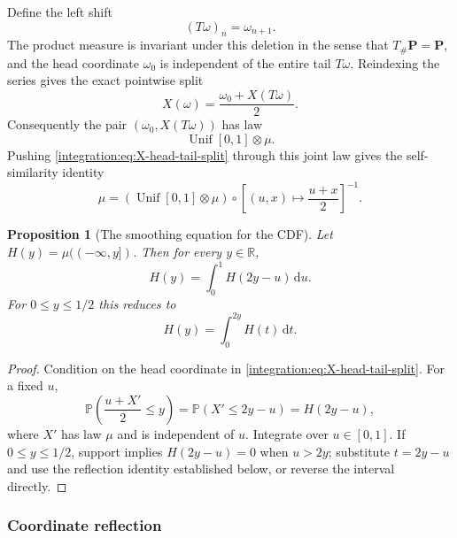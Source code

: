 \documentclass[11pt,oneside]{article}
\newtheorem{proposition}[theorem]{Proposition}
\theoremstyle{definition}
\theoremstyle{remark}
\newcommand{\R}{\mathbb R}
\newcommand{\dd}{\,\mathrm d}
\newcommand{\Prob}{\mathbb P}
\begin{document}
Define the left shift
\begin{equation}
 (T\omega)_n=\omega_{n+1}.
 \label{integration:eq:tail-map}
\end{equation}
The product measure is invariant under this deletion in the sense that $T_\#\mathbf P=\mathbf
P$, and the head coordinate $\omega_0$ is independent of the entire tail $T\omega$.  Reindexing
the series gives the exact pointwise split
\begin{equation}
 X(\omega)=\frac{\omega_0+X(T\omega)}2.
 \label{integration:eq:X-head-tail-split}
\end{equation}
Consequently the pair $(\omega_0,X(T\omega))$ has law
\begin{equation}
 \operatorname{Unif}[0,1]\otimes\mu.
 \label{integration:eq:head-tail-law}
\end{equation}
Pushing \eqref{integration:eq:X-head-tail-split} through this joint law gives the self-similarity identity
\begin{equation}
 \mu=\left(\operatorname{Unif}[0,1]\otimes\mu\right)
       \circ\left[(u,x)\mapsto\frac{u+x}{2}\right]^{-1}.
 \label{integration:eq:law-self-similarity}
\end{equation}

\begin{proposition}[The smoothing equation for the CDF]
\label{integration:prop:CDF-smoothing-detailed}
Let $H(y)=\mu(({-\infty},y])$.  Then for every $y\in\R$,
\begin{equation}
 H(y)=\int_0^1 H(2y-u)\dd u.
 \label{integration:eq:CDF-smoothing-detailed}
\end{equation}
For $0\le y\le1/2$ this reduces to
\begin{equation}
 H(y)=\int_0^{2y}H(t)\dd t.
 \label{integration:eq:CDF-left-detailed}
\end{equation}
\end{proposition}

\begin{proof}
Condition on the head coordinate in \eqref{integration:eq:X-head-tail-split}.  For a fixed $u$,
\[
 \Prob\!\left(\frac{u+X'}2\le y\right)=\Prob(X'\le2y-u)=H(2y-u),
\]
where $X'$ has law $\mu$ and is independent of $u$.  Integrate over $u\in[0,1]$.  If
$0\le y\le1/2$, support implies $H(2y-u)=0$ when $u>2y$; substitute $t=2y-u$ and use the
reflection identity established below, or reverse the interval directly.
\end{proof}

\subsubsection{Coordinate reflection}
\end{document}
